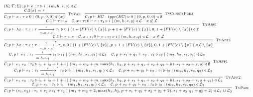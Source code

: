 \documentclass[fleqn]{article}
\begin{document}
\[
\scriptsize
\begin{array}{l}
(\mathcal{K}; \mathcal{T}; \Sigma);p \vdash e : \tau \triangleright i \mid (m, h, s, q) \triangleleft \mathcal{L} \\

\infer[\textsc{TyVar}]{\jtygc{\mathcal{C};p}{x}{\tau}{0}{0}{p}{0}{0}{\{ x \} }}{\mathcal{C}.2(x)=\tau} \hspace{1em}

\infer[\textsc{TyConst(Prim)}]{\jtygc{\mathcal{C};p}{EC}{type(EC)}{0}{0}{p}{0}{0}{\emptyset}}{} \\

\infer[\textsc{TyAbs1}]{\jtygc{ \mathcal{C};p}{ \lambda x:\tau. e}{ \tau \xrightarrow[m,h,s,q]{i} \tau_1 }{ 0 }{ 1 + |FV(e)\setminus \{ x \}| }{p + 1 + |FV(e)\setminus\{x\}|}{0}{1 + |FV(e) \setminus \{x\}|}{\mathcal{L} } }{\mathcal{C}.1 \vdash \tau :: \star & \jtygc{\mathcal{C},x:\tau; 0}{ e }{ \tau_1 }{ i }{ m }{h}{s}{q}{\mathcal{L}} & x \not\in \mathcal{L}  } \\

\infer[\textsc{TyAbs2}]{\jtygc{ \mathcal{C};p}{ \lambda x:\tau. e}{ \tau \xrightarrow[m,h,s,q]{i}^* \tau_1 }{ 0 }{ 1 + |FV(e)\setminus \{ x \}| }{p + 1 + |FV(e)\setminus\{x\}|}{0}{1 + |FV(e) \setminus \{x\}|}{\mathcal{L} \setminus \{x \} } }{\mathcal{C}.1 \vdash \tau :: \star & \jtygc{\mathcal{C},x:\tau; 0}{ e }{ \tau_1 }{ i }{ m }{h}{s}{q}{\mathcal{L}} & x \in \mathcal{L}  } \\

\infer[\textsc{TyApp1}]{\jtygc{\mathcal{C};p} { e_1~e_2 } { \tau_2 } { i_1 + i_2 + 1 + i } { m_1 + m_2 + m }{ \max(h_1,h_2,p+s_1+q_1+s_2+q_2+h) }{s_1+s_2+s}{q}{\emptyset} }{\jtygc{\mathcal{C};p} { e_1 }{ \tau_1 \xrightarrow[m,h,s,q]{i} \tau_2 }{ i_1 }{ m_1 }{h_1}{s_1}{q_1}{\mathcal{L}_1} & \jtygc{\mathcal{C};p+s_1+q_1 } { e_2 }{ \tau_1 }{ i_2 }{ m_2}{h_2}{s_2}{q_2}{\mathcal{L}_2 } } \\

\infer[\textsc{TyApp2}]{\jtygc{\mathcal{C};p} { e_1~e_2 } { \tau_2 } { i_1 + i_2 + 1 + i } { m_1 + m_2 + m }{ \max(h_1,h_2,p+s_1+q_1+s_2+q_2+h) }{s_1+s_2+s}{q+q_2}{\mathcal{L}_2} }{\jtygc{\mathcal{C};p} { e_1 }{ \tau_1 \xrightarrow[m,h,s,q]{i}^* \tau_2 }{ i_1 }{ m_1 }{h_1}{s_1}{q_1}{\mathcal{L}_1} & \jtygc{\mathcal{C};p+s_1+q_1 } { e_2 }{ \tau_1 }{ i_2 }{ m_2}{h_2}{s_2}{q_2}{\mathcal{L}_2 } } \\

\infer[\textsc{TyPair}]{\jtygc{\mathcal{C};p}{ (e_1,e_2) }{ \tau_1 \times \tau_2 }{ i_1 + i_2 }{ m_1 + m_2 + 2}{\max(h_1,h_2,p+s_1+q_1+s_2+q_2+2)}{s_1+s_2}{q_1+q_2+2}{\mathcal{L}_1 \cup \mathcal{L}_2 } }{\jtygc{\mathcal{C};p}{  e_1 }{ \tau_1 }{ i_1 }{m_1}{h_1}{s_1}{q_1}{\mathcal{L}_1} & \jtygc{\mathcal{C};p+s_1+q_1 }{ e_2 }{ \tau_2 }{ i_2 }{ m_2}{h_2}{s_2}{q_2}{\mathcal{L}_2} } \\


\end{array}\]
\end{document}
